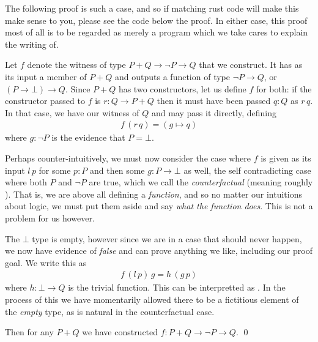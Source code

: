 \documentclass[11pt]{article}
\begin{document}
The following proof is such a case, and so if matching rust code will make this make sense to you, please see the code below the proof. In either case, this proof most of all is to be regarded as merely a program which we take cares to explain the writing of.

\begin{my proof}{}
Let $f$ denote the witness of type $P + Q \to \neg P \to Q$ that we construct. It has as its input a member of $P + Q$ and outputs a function of type $\neg P \to Q$, or $(P \to \bot) \to Q$. Since $P + Q$ has two constructors, let us define $f$ for both: if the constructor passed to $f$ is $r \colon Q \to P + Q$ then it must have been passed $q \colon Q$ as $r \hspace{2pt} q$. In that case, we have our witness of $Q$ and may pass it directly, defining \begin{gather*}
f \hspace{2pt} (r \hspace{2pt} q) = (g \mapsto q)
\end{gather*}
where $g\colon \neg P$ is the evidence that $P = \bot$.

Perhaps counter-intuitively, we must now consider the case where $f$ is given as its input $l\hspace{2pt} p$ for some $p \colon P$ and then some $g \colon P \to \bot$ as well, the self contradicting case where both $P$ and $\neg P$ are true, which we call the \emph{counterfactual} (meaning roughly ). That is, we are above all defining a \emph{function}, and so no matter our intuitions about logic, we must put them aside and say \emph{what the function does}. This is not a problem for us however.

The $\bot$ type is empty, however since we are in a case that should never happen, we now have evidence of \emph{false} and can prove anything we like, including our proof goal. We write this as \begin{gather*}
f \hspace{2pt} (l \hspace{2pt} p) \hspace{2pt} g = h \hspace{2pt} (g \hspace{2pt} p)
\end{gather*}
where $h \colon \bot \to Q$ is the trivial function. This can be interpretted as . In the process of this we have momentarily allowed there to be a fictitious element of the \emph{empty} type, as is natural in the counterfactual case.

Then for any $P + Q$ we have constructed $f \colon P + Q \to \neg P \to Q$. \qed
\end{my proof}
\end{document}
